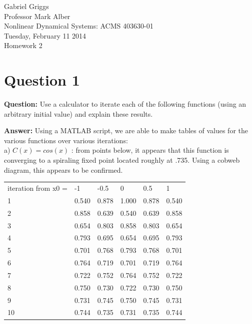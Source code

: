 \documentclass[12pt]{article}
\newenvironment{myenv}{\begin{adjustwidth}{1cm}{}}{\end{adjustwidth}}
\begin{document}
{\raggedleft{}Gabriel Griggs} \\
Professor Mark Alber \\
Nonlinear Dynamical Systems: ACMS 403630-01 \\
Tuesday, February 11 2014\\
Homework 2
\section*{Question 1}
\begin{myenv}
\textbf{Question:} Use a calculator to iterate each of the following functions (using an arbitrary initial value) and explain these results.

\textbf{Answer:} Using a MATLAB script, we are able to make tables of values for the various functions over various iterations: \\

a) $C(x) = cos(x)$ : from points below, it appears that this function is converging to a spiraling fixed point located roughly at .735. Using a cobweb diagram, this appears to be confirmed.


\begin{table}[h]
\begin{tabular}{llllll}
iteration from x0 = & -1    & -0.5  & 0     & 0.5   & 1     \\
1                   & 0.540 & 0.878 & 1.000 & 0.878 & 0.540 \\
2                   & 0.858 & 0.639 & 0.540 & 0.639 & 0.858 \\
3                   & 0.654 & 0.803 & 0.858 & 0.803 & 0.654 \\
4                   & 0.793 & 0.695 & 0.654 & 0.695 & 0.793 \\
5                   & 0.701 & 0.768 & 0.793 & 0.768 & 0.701 \\
6                   & 0.764 & 0.719 & 0.701 & 0.719 & 0.764 \\
7                   & 0.722 & 0.752 & 0.764 & 0.752 & 0.722 \\
8                   & 0.750 & 0.730 & 0.722 & 0.730 & 0.750 \\
9                   & 0.731 & 0.745 & 0.750 & 0.745 & 0.731 \\
10                  & 0.744 & 0.735 & 0.731 & 0.735 & 0.744
\end{tabular}
\end{table}


\end{myenv}
\end{document}
